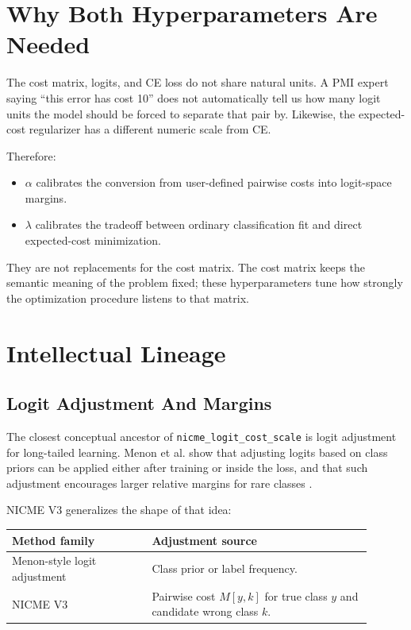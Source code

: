 \documentclass[11pt]{article}
\newcommand{\code}[1]{\texttt{#1}}
\begin{document}
\section{Why Both Hyperparameters Are Needed}

The cost matrix, logits, and CE loss do not share natural units.
A PMI expert saying ``this error has cost 10'' does not automatically tell us how many logit units the model should be forced to separate that pair by.
Likewise, the expected-cost regularizer has a different numeric scale from CE.

Therefore:

\begin{itemize}
  \item $\alpha$ calibrates the conversion from user-defined pairwise costs into logit-space margins.
  \item $\lambda$ calibrates the tradeoff between ordinary classification fit and direct expected-cost minimization.
\end{itemize}

They are not replacements for the cost matrix. The cost matrix keeps the semantic meaning of the problem fixed; these hyperparameters tune how strongly the optimization procedure listens to that matrix.

\section{Intellectual Lineage}

\subsection{Logit Adjustment And Margins}

The closest conceptual ancestor of \code{nicme\_logit\_cost\_scale} is logit adjustment for long-tailed learning.
Menon et al. show that adjusting logits based on class priors can be applied either after training or inside the loss, and that such adjustment encourages larger relative margins for rare classes \cite{menon2021logit}.

NICME V3 generalizes the shape of that idea:

\begin{center}
\begin{tabular}{p{0.35\linewidth} p{0.55\linewidth}}
\toprule
Method family & Adjustment source \\
\midrule
Menon-style logit adjustment & Class prior or label frequency. \\
NICME V3 & Pairwise cost $M[y,k]$ for true class $y$ and candidate wrong class $k$. \\
\bottomrule
\end{tabular}
\end{center}
\end{document}
